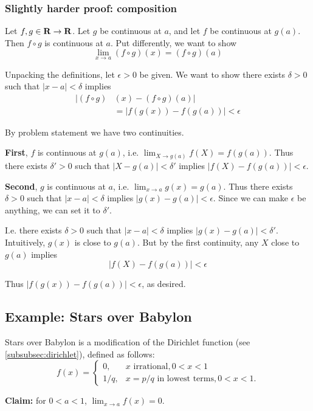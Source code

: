 \subsubsection*{Slightly harder proof: composition}

Let $f,g\in\mathbf{R}\to\mathbf{R}$. Let $g$ be continuous at $a$, and let $f$ be
continuous at $g(a)$. Then $f\circ g$ is continuous at $a$. Put
differently, we want to show
\[\lim_{x\to a}(f\circ g)(x)=(f\circ g)(a)\]

Unpacking the definitions, let $\epsilon>0$ be given. We want to show there
exists $\delta>0$ such that $|x-a|<\delta$ implies
\begin{align*}
    |(f\circ g)&(x)-(f\circ g)(a)|\\
    &=|f(g(x))-f(g(a))|<\epsilon
\end{align*}

By problem statement we have two continuities.

\vs

\textbf{First}, $f$ is continuous at $g(a)$, i.e.
$\lim_{X\to g(a)}f(X)=f(g(a))$. Thus there exists $\delta'>0$ such that
$|X-g(a)|<\delta'$ implies $|f(X)-f(g(a))|<\epsilon$.

\vs

\textbf{Second}, $g$ is continuous at $a$, i.e.
$\lim_{x\to a}g(x)=g(a)$. Thus there exists $\delta>0$ such that
$|x-a|<\delta$ implies $|g(x)-g(a)|<\epsilon$. Since we can make
$\epsilon$ be anything, we can set it to $\delta'$.

\vs

I.e. there exists $\delta>0$ such that $|x-a|<\delta$ implies
$|g(x)-g(a)|<\delta'$. Intuitively, $g(x)$ is close to $g(a)$. But by the
first continuity, any $X$ close to $g(a)$ implies
\[|f(X)-f(g(a))|<\epsilon\]

Thus $|f(g(x))-f(g(a))|<\epsilon$, as desired.

\subsection{Example: Stars over Babylon}
Stars over Babylon is a modification of the Dirichlet function (see
\ref{subsubsec:dirichlet}), defined as follows:
\[
f(x) = 
\begin{cases} 
  0, & \text{$x$ irrational}, 0<x<1\\
  1/q, & x=p/q \text{ in lowest terms}, 0<x<1.
\end{cases}
\]

\textbf{Claim:} for $0<a<1$, $\lim_{x\to a}f(x)=0$.

